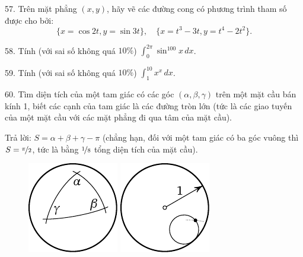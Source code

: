 \begin{problem}{57.}
	Trên mặt phẳng $(x,y)$, hãy vẽ các đường cong có phương trình tham số được cho bởi:
	\begin{equation*}
		\{x=\cos 2t, y=\sin 3t\},\quad 
		\{x=t^3-3t, y=t^4-2t^2\}.
	\end{equation*}
	\vspace{-2\baselineskip}%
\end{problem}

\begin{problem}{58.}
	Tính (với sai số không quá $10 \%$) $\int_0^{2\pi}\sin^{100}x\,dx$.
\end{problem}

\begin{problem}{59.}
	Tính (với sai số không quá $10 \%$) $\int_1^{10} x^x\,dx$.
\end{problem}

\begin{problem}{60.}
	Tìm diện tích của một tam giác có các góc $(\alpha, \beta, \gamma)$ trên một mặt cầu bán kính 1, biết các cạnh của tam giác là các đường tròn lớn (tức là các giao tuyến của một mặt cầu với các mặt phẳng đi qua tâm của mặt cầu).

	\begin{note}{Trả lời:}
		 $S=\alpha+\beta+\gamma-\pi$ (chẳng hạn, đối với một tam giác có ba góc vuông thì $S=\nicefrac{\pi}{2}$, tức là bằng $\nicefrac{1}{8}$ tổng diện tích của mặt cầu).
		\begin{figure}
			\null\hfill
			\includegraphics{taskbook-44}
			\hfill
			\includegraphics{taskbook-45}
			\hfill\null
		\end{figure}
	\end{note}
\end{problem}

